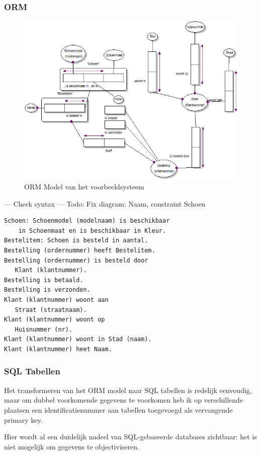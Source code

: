\documentclass{article}
\begin{document}
\subsubsection{ORM}
\begin{figure}[htp]
  \centering
  \includegraphics[keepaspectratio=true, width=345pt]{model1.png}
  \caption{ORM Model van het voorbeeldsysteem}
  \label{img:model1}
\end{figure}

\Large{--- Check syntax --- }
\Large{Todo: Fix diagram: Naam, constraint Schoen}

\begin{verbatim}
Schoen: Schoenmodel (modelnaam) is beschikbaar
    in Schoenmaat en is beschikbaar in Kleur.
Bestelitem: Schoen is besteld in aantal.
Bestelling (ordernummer) heeft Bestelitem.
Bestelling (ordernummer) is besteld door 
   Klant (klantnummer).
Bestelling is betaald.
Bestelling is verzonden.
Klant (klantnummer) woont aan 
   Straat (straatnaam).
Klant (klantnummer) woont op 
   Huisnummer (nr).
Klant (klantnummer) woont in Stad (naam).
Klant (klantnummer) heet Naam.
\end{verbatim}

\subsubsection{SQL Tabellen}

Het transformeren van het ORM model naar SQL tabellen is redelijk 
eenvoudig, maar om dubbel voorkomende gegevens te voorkomen heb ik
op verschillende plaatsen een identificatienummer aan tabellen 
toegevoegd als vervangende primary key.

Hier wordt al een duidelijk nadeel van SQL-gebaseerde databases
zichtbaar: het is niet mogelijk om gegevens te objectiviseren.
\end{document}
